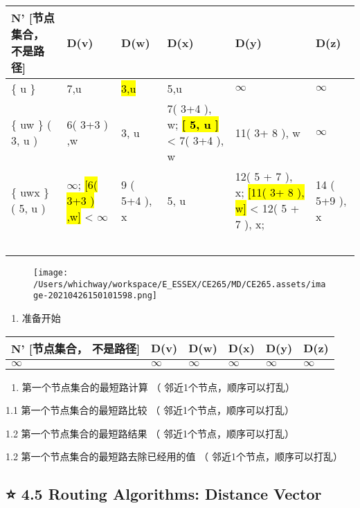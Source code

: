 \documentclass[
]{article}
\begin{document}
\begin{longtable}[]{@{}llllll@{}}
\toprule
N' {[}节点集合， 不是路径{]} & D(v) & D(w) & D(x) & D(y) &
D(z)\tabularnewline
\midrule
\endhead
\{ u \} & 7,u & \hl{3,u} & 5,u & \(\infty\) & \(\infty\)\tabularnewline
\{ uw \} ( 3, u ) & 6( 3+3 ) ,w & 3, u & 7( 3+4 ), w; \hl{\textbf{{[} 5,
u {]}}} \textless{} 7( 3+4 ), w & 11( 3+ 8 ), w &
\(\infty\)\tabularnewline
\{ uwx \} ( 5, u ) & \(\infty\); \hl{{[}6( 3+3 ) ,w{]}} \textless{}
\(\infty\) & 9 ( 5+4 ), x & 5, u & 12( 5 + 7 ), x; \hl{{[}11( 3+ 8 ),
w{]}} \textless{} 12( 5 + 7 ), x; & 14 ( 5+9 ), x\tabularnewline
& & & & &\tabularnewline
& & & & &\tabularnewline
& & & & &\tabularnewline
& & & & &\tabularnewline
& & & & &\tabularnewline
\bottomrule
\end{longtable}

\begin{figure}
\centering
\texttt{[image: /Users/whichway/workspace/E\_ESSEX/CE265/MD/CE265.assets/image-20210426150101598.png]}
\caption{}
\end{figure}

\begin{enumerate}
\def\labelenumi{\arabic{enumi}.}
\item
  准备开始
\end{enumerate}

\begin{longtable}[]{@{}llllll@{}}
\toprule
N' {[}节点集合， 不是路径{]} & D(v) & D(w) & D(x) & D(y) &
D(z)\tabularnewline
\midrule
\endhead
\(\infty\) & \(\infty\) & \(\infty\) & \(\infty\) & \(\infty\) &
\(\infty\)\tabularnewline
\bottomrule
\end{longtable}

\begin{enumerate}
\def\labelenumi{\arabic{enumi}.}
\item
  第一个节点集合的最短路计算 （ 邻近1个节点，顺序可以打乱）
\end{enumerate}

1.1 第一个节点集合的最短路比较 （ 邻近1个节点，顺序可以打乱）

1.2 第一个节点集合的最短路结果 （ 邻近1个节点，顺序可以打乱）

1.2 第一个节点集合的最短路去除已经用的值 （ 邻近1个节点，顺序可以打乱）

\hypertarget{-45-routing-algorithms-distance-vector}{%
\subsection{⭐️ 4.5 Routing Algorithms: Distance
Vector}\label{-45-routing-algorithms-distance-vector}}
\end{document}
